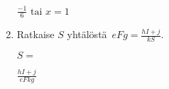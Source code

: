 \documentclass[finnish, a4paper, 12pt]{article}
\begin{document}
\begin{enumerate}[leftmargin=*]
		\begin{version:withAnswers}
		\(\frac{-1}{6} \text{  tai } x = 1\)
		\end{version:withAnswers}
		\vspace{8pt}
		
		\item %
		Ratkaise \(S\) yhtälöstä 
		\(
		\displaystyle \,
		eFg = \frac{hI+j}{kS} .
		\)	
		
		\(
		S = 
		\) %
		\begin{version:withAnswers}
		\( \frac{hI+j}{eFkg}\)
		\end{version:withAnswers}
		
	\end{enumerate}
	
	
\end{document}

